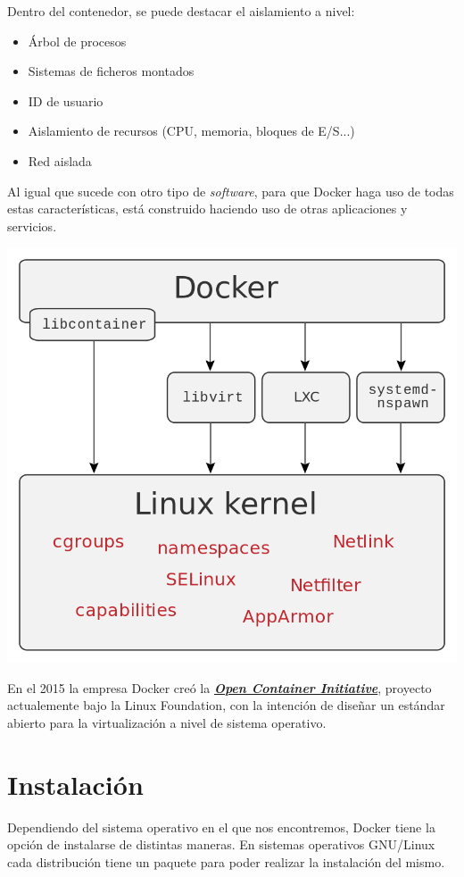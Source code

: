 Dentro del contenedor, se puede destacar el aislamiento a nivel:

\begin{itemize}
    \item Árbol de procesos
    \item Sistemas de ficheros montados
    \item ID de usuario
    \item Aislamiento de recursos (CPU, memoria, bloques de E/S...)
    \item Red aislada
\end{itemize}

Al igual que sucede con otro tipo de \textit{software},  para que Docker haga uso de todas estas características, está construido haciendo uso de otras aplicaciones y servicios.


\begin{center}
    \includegraphics[width=0.6\linewidth]{img/docker/docker_interfaces.png}
\end{center}

En el 2015 la empresa Docker creó la \textbf{\textit{\href{https://en.wikipedia.org/wiki/Open_Container_Initiative}{Open Container Initiative}}}, proyecto actualemente bajo la Linux Foundation, con la intención de diseñar un estándar abierto para la virtualización a nivel de sistema operativo.

\section{Instalación}

Dependiendo del sistema operativo en el que nos encontremos, Docker tiene la opción de instalarse de distintas maneras. En sistemas operativos GNU/Linux cada distribución tiene un paquete para poder realizar la instalación del mismo.

